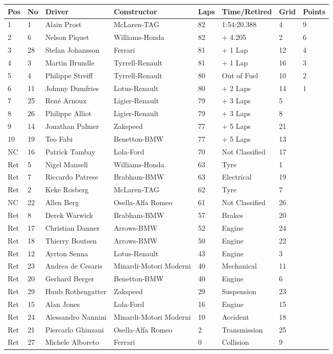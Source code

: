 \documentclass{article}
\begin{document}
\begin{tabular}{llllllll}
\toprule
Pos & No & Driver & Constructor & Laps & Time/Retired & Grid & Points \\
\midrule
1 & 1 & Alain Prost & McLaren-TAG & 82 & 1:54:20.388 & 4 & 9 \\
2 & 6 & Nelson Piquet & Williams-Honda & 82 & + 4.205 & 2 & 6 \\
3 & 28 & Stefan Johansson & Ferrari & 81 & + 1 Lap & 12 & 4 \\
4 & 3 & Martin Brundle & Tyrrell-Renault & 81 & + 1 Lap & 16 & 3 \\
5 & 4 & Philippe Streiff & Tyrrell-Renault & 80 & Out of Fuel & 10 & 2 \\
6 & 11 & Johnny Dumfries & Lotus-Renault & 80 & + 2 Laps & 14 & 1 \\
7 & 25 & René Arnoux & Ligier-Renault & 79 & + 3 Laps & 5 &  \\
8 & 26 & Philippe Alliot & Ligier-Renault & 79 & + 3 Laps & 8 &  \\
9 & 14 & Jonathan Palmer & Zakspeed & 77 & + 5 Laps & 21 &  \\
10 & 19 & Teo Fabi & Benetton-BMW & 77 & + 5 Laps & 13 &  \\
NC & 16 & Patrick Tambay & Lola-Ford & 70 & Not Classified & 17 &  \\
Ret & 5 & Nigel Mansell & Williams-Honda & 63 & Tyre & 1 &  \\
Ret & 7 & Riccardo Patrese & Brabham-BMW & 63 & Electrical & 19 &  \\
Ret & 2 & Keke Rosberg & McLaren-TAG & 62 & Tyre & 7 &  \\
NC & 22 & Allen Berg & Osella-Alfa Romeo & 61 & Not Classified & 26 &  \\
Ret & 8 & Derek Warwick & Brabham-BMW & 57 & Brakes & 20 &  \\
Ret & 17 & Christian Danner & Arrows-BMW & 52 & Engine & 24 &  \\
Ret & 18 & Thierry Boutsen & Arrows-BMW & 50 & Engine & 22 &  \\
Ret & 12 & Ayrton Senna & Lotus-Renault & 43 & Engine & 3 &  \\
Ret & 23 & Andrea de Cesaris & Minardi-Motori Moderni & 40 & Mechanical & 11 &  \\
Ret & 20 & Gerhard Berger & Benetton-BMW & 40 & Engine & 6 &  \\
Ret & 29 & Huub Rothengatter & Zakspeed & 29 & Suspension & 23 &  \\
Ret & 15 & Alan Jones & Lola-Ford & 16 & Engine & 15 &  \\
Ret & 24 & Alessandro Nannini & Minardi-Motori Moderni & 10 & Accident & 18 &  \\
Ret & 21 & Piercarlo Ghinzani & Osella-Alfa Romeo & 2 & Transmission & 25 &  \\
Ret & 27 & Michele Alboreto & Ferrari & 0 & Collision & 9 &  \\
\bottomrule
\end{tabular}
\end{document}
